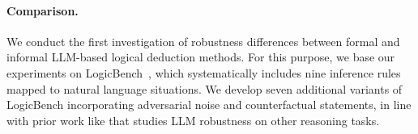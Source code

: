 \paragraph{Comparison.} We conduct the first investigation of robustness differences between formal and informal \ac{LLM}-based logical deduction methods. For this purpose, we base our experiments on LogicBench~\cite{mihir_parmar_logicbench_2023}, which systematically includes nine inference rules mapped to natural language situations. We develop seven additional variants of LogicBench incorporating adversarial noise and counterfactual statements, in line with prior work like \cite{nakamura-etal-2023-logicattack} that studies \ac{LLM} robustness on other reasoning tasks.